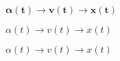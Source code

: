 \documentclass{article}
\begin{document}
$\mathbf{\alpha(t) \rightarrow v(t) \rightarrow x(t)}$

${\alpha(t) \rightarrow v(t) \rightarrow x(t)}$

${\alpha(t) \rightarrow v(t) \rightarrow x(t)}$
\end{document}
